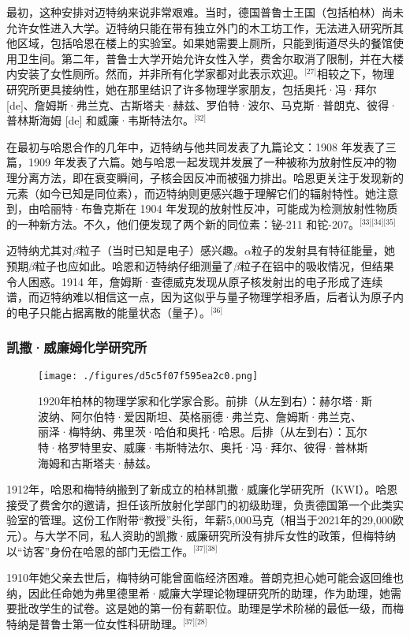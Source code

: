 最初，这种安排对迈特纳来说非常艰难。当时，德国普鲁士王国（包括柏林）尚未允许女性进入大学。迈特纳只能在带有独立外门的木工坊工作，无法进入研究所其他区域，包括哈恩在楼上的实验室。如果她需要上厕所，只能到街道尽头的餐馆使用卫生间。第二年，普鲁士大学开始允许女性入学，费舍尔取消了限制，并在大楼内安装了女性厕所。然而，并非所有化学家都对此表示欢迎。\(^\text{[27]}\)相较之下，物理研究所更具接纳性，她在那里结识了许多物理学家朋友，包括奥托·冯·拜尔 [de]、詹姆斯·弗兰克、古斯塔夫·赫兹、罗伯特·波尔、马克斯·普朗克、彼得·普林斯海姆 [de] 和威廉·韦斯特法尔。\(^\text{[32]}\)

在最初与哈恩合作的几年中，迈特纳与他共同发表了九篇论文：1908 年发表了三篇，1909 年发表了六篇。她与哈恩一起发现并发展了一种被称为放射性反冲的物理分离方法，即在衰变瞬间，子核会因反冲而被强力排出。哈恩更关注于发现新的元素（如今已知是同位素），而迈特纳则更感兴趣于理解它们的辐射特性。她注意到，由哈丽特·布鲁克斯在 1904 年发现的放射性反冲，可能成为检测放射性物质的一种新方法。不久，他们便发现了两个新的同位素：铋-211 和铊-207。\(^\text{[33][34][35]}\)

迈特纳尤其对$\beta$粒子（当时已知是电子）感兴趣。$\alpha$粒子的发射具有特征能量，她预期$\beta$粒子也应如此。哈恩和迈特纳仔细测量了$\beta$粒子在铝中的吸收情况，但结果令人困惑。1914 年，詹姆斯·查德威克发现从原子核发射出的电子形成了连续谱，而迈特纳难以相信这一点，因为这似乎与量子物理学相矛盾，后者认为原子内的电子只能占据离散的能量状态（量子）。\(^\text{[36]}\)
\subsubsection{凯撒·威廉姆化学研究所}
\begin{figure}[ht]
\centering
\texttt{[image: ./figures/d5c5f07f595ea2c0.png]}
\caption{1920年柏林的物理学家和化学家合影。前排（从左到右）：赫尔塔·斯波纳、阿尔伯特·爱因斯坦、英格丽德·弗兰克、詹姆斯·弗兰克、丽泽·梅特纳、弗里茨·哈伯和奥托·哈恩。后排（从左到右）：瓦尔特·格罗特里安、威廉·韦斯特法尔、奥托·冯·拜尔、彼得·普林斯海姆和古斯塔夫·赫兹。} \label{fig_LZm_5}
\end{figure}
1912年，哈恩和梅特纳搬到了新成立的柏林凯撒·威廉化学研究所（KWI）。哈恩接受了费舍尔的邀请，担任该所放射化学部门的初级助理，负责德国第一个此类实验室的管理。这份工作附带“教授”头衔，年薪5,000马克（相当于2021年的29,000欧元）。与大学不同，私人资助的凯撒·威廉研究所没有排斥女性的政策，但梅特纳以“访客”身份在哈恩的部门无偿工作。\(^\text{[37][38]}\)

1910年她父亲去世后，梅特纳可能曾面临经济困难。普朗克担心她可能会返回维也纳，因此任命她为弗里德里希·威廉大学理论物理研究所的助理，作为助理，她需要批改学生的试卷。这是她的第一份有薪职位。助理是学术阶梯的最低一级，而梅特纳是普鲁士第一位女性科研助理。\(^\text{[37][28]}\)

